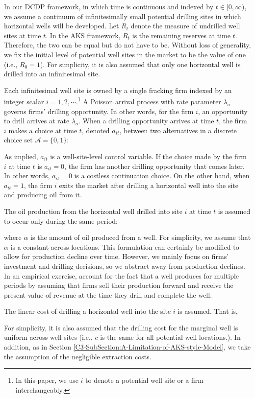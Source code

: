 In our DCDP framework, in which time is continuous and indexed by $t \in [0, \infty)$, we assume a continuum of infinitesimally small potential drilling sites in which horizontal wells will be developed. Let $R_{t}$ denote the measure of undrilled well sites at time $t$. In the AKS framework, $R_{t}$ is the remaining reserves at time $t$. Therefore, the two can be equal but do not have to be. Without loss of generality, we fix the initial level of potential well sites in the market to be the value of one (i.e., $R_{0} = 1$). For simplicity, it is also assumed that only one horizontal well is drilled into an infinitesimal site. 

Each infinitesimal well site is owned by a single fracking firm indexed by an integer scalar $i = 1, 2, \cdots$.\footnote{In this paper, we use $i$ to denote a potential well site or a firm interchangeably.} A Poisson arrival process with rate parameter $\lambda_{a}$ governs firms' drilling opportunity. In other words, for the firm $i$, an opportunity to drill arrives at rate $\lambda_{a}$. When a drilling opportunity arrives at time $t$, the firm $i$ makes a choice at time $t$, denoted $a_{it}$, between two alternatives in a discrete choice set $\mathcal{A} = \{ 0, 1 \}$:

As implied, $a_{it}$ is a well-site-level control variable. If the choice made by the firm $i$ at time $t$ is $a_{it} = 0$, the firm has another drilling opportunity that comes later. In other words, $a_{it} = 0$ is a costless continuation choice. On the other hand, when $a_{it} = 1$, the firm $i$ exits the market after drilling a horizontal well into the site and producing oil from it. 

The oil production from the horizontal well drilled into site $i$ at time $t$ is assumed to occur only during the same period:

where $\alpha$ is the amount of oil produced from a well. For simplicity, we assume that $\alpha$ is a constant across locations. This formulation can certainly be modified to allow for production decline over time. However, we mainly focus on firms' investment and drilling decisions, so we abstract away from production declines. In an empirical exercise, account for the fact that a well produces for multiple periods by assuming that firms sell their production forward and receive the present value of revenue at the time they drill and complete the well. 

The linear cost of drilling a horizontal well into the site $i$ is assumed. That is,

For simplicity, it is also assumed that the drilling cost for the marginal well is uniform across well sites (i.e., $c$ is the same for all potential well locations.). In addition, as in Section \ref{C3-SubSection:A-Limitation-of-AKS-style-Model}, we take the assumption of the negligible extraction costs.


